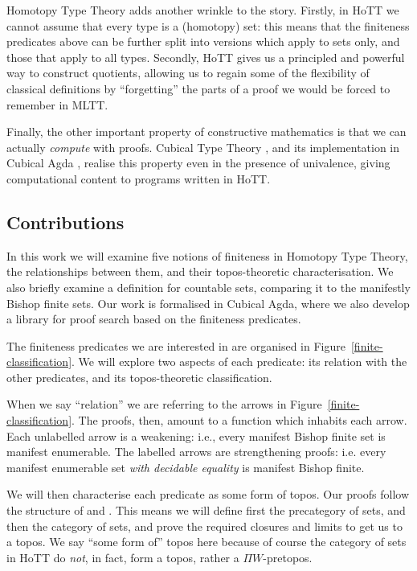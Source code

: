 Homotopy Type Theory \cite{hottbook} adds another wrinkle to the story.
Firstly, in HoTT we cannot assume that every type is a (homotopy) set: this
means that the finiteness predicates above can be further split into versions
which apply to sets only, and those that apply to all types.
Secondly, HoTT gives us a principled and powerful way to construct quotients,
allowing us to regain some of the flexibility of classical definitions by
``forgetting'' the parts of a proof we would be forced to remember in MLTT.

Finally, the other important property of constructive mathematics is that we can
actually \emph{compute} with proofs.
Cubical Type Theory \cite{cohenCubicalTypeTheory2016}, and its implementation in
Cubical Agda \cite{vezzosiCubicalAgdaDependently2019}, realise this property
even in the presence of univalence, giving computational content to programs
written in HoTT.
\subsection{Contributions}
In this work we will examine five notions of finiteness in Homotopy Type Theory,
the relationships between them, and their topos-theoretic characterisation.
We also briefly examine a definition for countable sets, comparing it to the
manifestly Bishop finite sets.
Our work is formalised in Cubical Agda, where we also develop a library for
proof search based on the finiteness predicates.



The finiteness predicates we are interested in are organised in
Figure~\ref{finite-classification}.
We will explore two aspects of each predicate: its relation with the other
predicates, and its topos-theoretic classification.

When we say ``relation'' we are referring to the arrows in
Figure~\ref{finite-classification}.
The proofs, then, amount to a function which inhabits each arrow.
Each unlabelled arrow is a weakening: i.e., every manifest Bishop finite set
is manifest enumerable.
The labelled arrows are strengthening proofs: i.e. every manifest enumerable set
\emph{with decidable equality} is manifest Bishop finite.

We will then characterise each predicate as some form of topos.
Our proofs follow the structure of \cite[Chapters 9, 10]{hottbook} and
\cite{rijkeSetsHomotopyType2015}.
This means we will define first the precategory of sets, and then the category
of sets, and prove the required closures and limits to get us to a topos.
We say ``some form of'' topos here because of course the category of sets in
HoTT do \emph{not}, in fact, form a topos, rather a \(\Pi W\)-pretopos.

